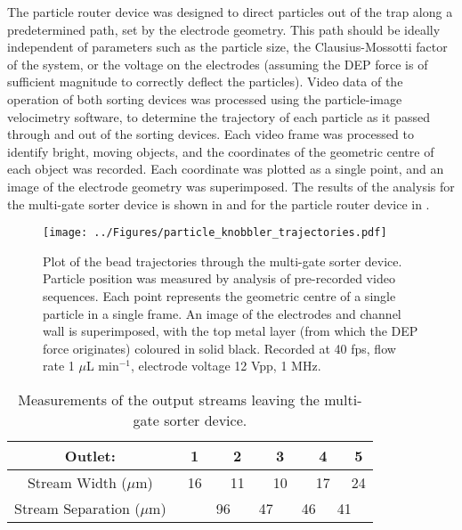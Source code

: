 The particle router device was designed to direct particles out of the trap along a predetermined path, set by the electrode geometry. This path should be ideally independent of parameters such as the particle size, the Clausius-Mossotti factor of the system, or the voltage on the electrodes (assuming the DEP force is of sufficient magnitude to correctly deflect the particles). Video data of the operation of both sorting devices was processed using the particle-image velocimetry software, to determine the trajectory of each particle as it passed through and out of the sorting devices. Each video frame was processed to identify bright, moving objects, and the coordinates of the geometric centre of each object was recorded. Each coordinate was plotted as a single point, and an image of the electrode geometry was superimposed. The results of the analysis for the multi-gate sorter device is shown in  and for the particle router device in .

\clearpage

\begin{figure}[p]
 \centering
 \texttt{[image: ../Figures/particle\_knobbler\_trajectories.pdf]}
 \caption[Plot of the particle trajectories through the multi-gate sorter device.]{Plot of the bead trajectories through the multi-gate sorter device. Particle position was measured by analysis of pre-recorded video sequences. Each point represents the geometric centre of a single particle in a single frame. An image of the electrodes and channel wall is superimposed, with the top metal layer (from which the DEP force originates) coloured in solid black. Recorded at 40 fps, flow rate 1 $\mu$L min$^{-1}$, electrode voltage 12 Vpp, 1 MHz.}
 \label{fig:particle_knobbler_trajectories}
\end{figure}


\begin{table}[p]
	\centering
		\begin{tabular} {c c c c c c c c c c c}
		\hline
		Outlet: & \multicolumn{2}{c}{1} & \multicolumn{2}{c}{2} & \multicolumn{2}{c}{3} & \multicolumn{2}{c}{4} & \multicolumn{2}{c}{5} \\
		\hline
		Stream Width ($\mu$m) & \multicolumn{2}{c}{16} & \multicolumn{2}{c}{11} & \multicolumn{2}{c}{10} & \multicolumn{2}{c}{17} & \multicolumn{2}{c}{24} \\
		Stream Separation ($\mu$m) & &	\multicolumn{2}{c}{96} & \multicolumn{2}{c}{47} & \multicolumn{2}{c}{46} & \multicolumn{2}{c}{41} &  \\
		\hline			
		\end{tabular}
	\caption{Measurements of the output streams leaving the multi-gate sorter device.}
	\label{tab:particle_knobbler_stream_measurements}
\end{table}


